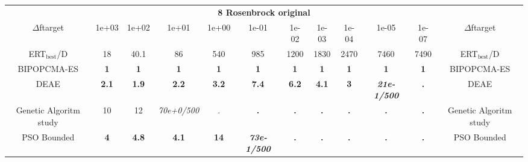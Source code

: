 \begin{tabular}{cccccccccccc}
 & \multicolumn{10}{c}{{\normalsize \textbf{8 Rosenbrock original}}}\\
$\Delta$ftarget& 1e+03& 1e+02& 1e+01& 1e+00& 1e-01& 1e-02& 1e-03& 1e-04& 1e-05& 1e-07 & $\Delta$ftarget \\
ERT$_{\textrm{best}}$/D& 18& 40.1& 86& 540& 985& 1200& 1830& 2470& 7460& 7490 & ERT$_{\textrm{best}}$/D \\
\hline
BIPOPCMA-ES & \textbf{1} & \textbf{1} & \textbf{1} & \textbf{1} & \textbf{1} & \textbf{1} & \textbf{1} & \textbf{1} & \textbf{1} & \textbf{1} & BIPOPCMA-ES \cite{add_an_entry_for_BIPOPCMA-ES_in_bbob.bib}\\
DEAE & \textbf{2.1} & \textbf{1.9} & \textbf{2.2} & \textbf{3.2} & \textbf{7.4} & \textbf{6.2} & \textbf{4.1} & \textbf{3} & \textbf{\textit{21e-1}\textit{/500}} & \textbf{.} & DEAE \cite{add_an_entry_for_DEAE_in_bbob.bib}\\
Genetic Algoritm study & 10 & 12 & \textit{70e+0}\textit{/500} & . & \textbf{.} & \textbf{.} & \textbf{.} & \textbf{.} & \textbf{.} & \textbf{.} & Genetic Algoritm study \cite{add_an_entry_for_Genetic Algoritm study_in_bbob.bib}\\
PSO Bounded & \textbf{4} & \textbf{4.8} & \textbf{4.1} & \textbf{14} & \textbf{\textit{73e-1}\textit{/500}} & \textbf{.} & \textbf{.} & \textbf{.} & \textbf{.} & \textbf{.} & PSO Bounded \cite{add_an_entry_for_PSO Bounded_in_bbob.bib}
\end{tabular}
